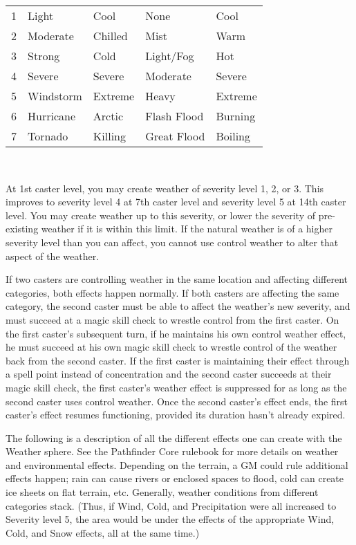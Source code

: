 {{\begin{tabular}{lllll}
		1	& Light		& Cool		& None			& Cool		\\
		2	& Moderate	& Chilled	& Mist			& Warm		\\
		3	& Strong	& Cold		& Light/Fog		& Hot		\\
		4	& Severe	& Severe	& Moderate		& Severe	\\
		5	& Windstorm	& Extreme	& Heavy			& Extreme	\\
		6	& Hurricane	& Arctic	& Flash Flood	& Burning	\\
		7	& Tornado	& Killing	& Great Flood	& Boiling
	\end{tabular}}\\
	\par At 1st caster level, you may create weather of severity level 1, 2, or 3. This improves to severity level 4 at 7th caster level and severity level 5 at 14th caster level. You may create weather up to this severity, or lower the severity of pre-existing weather if it is within this limit. If the natural weather is of a higher severity level than you can affect, you cannot use control weather to alter that aspect of the weather.
	\par If two casters are controlling weather in the same location and affecting different categories, both effects happen normally. If both casters are affecting the same category, the second caster must be able to affect the weather's new severity, and must succeed at a magic skill check to wrestle control from the first caster. On the first caster's subsequent turn, if he maintains his own control weather effect, he must succeed at his own magic skill check to wrestle control of the weather back from the second caster. If the first caster is maintaining their effect through a spell point instead of concentration and the second caster succeeds at their magic skill check, the first caster's weather effect is suppressed for as long as the second caster uses control weather. Once the second caster's effect ends, the first caster's effect resumes functioning, provided its duration hasn't already expired.
	\par The following is a description of all the different effects one can create with the Weather sphere. See the Pathfinder Core rulebook for more details on weather and environmental effects. Depending on the terrain, a GM could rule additional effects happen; rain can cause rivers or enclosed spaces to flood, cold can create ice sheets on flat terrain, etc. Generally, weather conditions from different categories stack. (Thus, if Wind, Cold, and Precipitation were all increased to Severity level 5, the area would be under the effects of the appropriate Wind, Cold, and Snow effects, all at the same time.)\\\\
}
